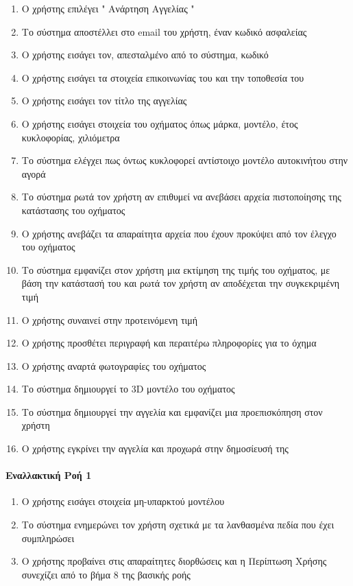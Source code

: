 \documentclass{../ol-softwaremanual}
\begin{document}
	\begin{enumerate}
		
		\item Ο χρήστης επιλέγει \en " \gr Ανάρτηση Αγγελίας \en " \gr 
		\item Το σύστημα αποστέλλει στο \en email \gr του χρήστη, έναν κωδικό ασφαλείας
		\item Ο χρήστης εισάγει τον, απεσταλμένο από το σύστημα, κωδικό
		\item Ο χρήστης εισάγει τα στοιχεία επικοινωνίας του και την τοποθεσία του
		\item Ο χρήστης εισάγει τον τίτλο της αγγελίας
		\item Ο χρήστης εισάγει στοιχεία του οχήματος όπως μάρκα, μοντέλο, έτος κυκλοφορίας, χιλιόμετρα
		\item Το σύστημα ελέγχει πως όντως κυκλοφορεί αντίστοιχο μοντέλο αυτοκινήτου στην αγορά
		\item Το σύστημα ρωτά τον χρήστη αν επιθυμεί να ανεβάσει αρχεία πιστοποίησης της κατάστασης του οχήματος
		\item Ο χρήστης ανεβάζει τα απαραίτητα αρχεία που έχουν προκύψει από τον έλεγχο του οχήματος		
		\item Το σύστημα εμφανίζει στον χρήστη μια εκτίμηση της τιμής του οχήματος, με βάση την κατάστασή του και ρωτά τον χρήστη αν αποδέχεται την συγκεκριμένη τιμή
		\item Ο χρήστης συναινεί στην προτεινόμενη τιμή
		\item Ο χρήστης προσθέτει περιγραφή και περαιτέρω πληροφορίες για το όχημα
		\item Ο χρήστης αναρτά φωτογραφίες του οχήματος
		\item Το σύστημα δημιουργεί το \en 3D \gr μοντέλο του οχήματος
		\item Το σύστημα δημιουργεί την αγγελία και εμφανίζει μια προεπισκόπηση στον χρήστη
		\item Ο χρήστης εγκρίνει την αγγελία και προχωρά στην δημοσίευσή της		
	\end{enumerate}
	
	\paragraph{Εναλλακτική Ροή 1}
	
	\begin{enumerate}
		\item O χρήστης εισάγει στοιχεία μη-υπαρκτού μοντέλου
		\item Το σύστημα ενημερώνει τον χρήστη σχετικά με τα λανθασμένα πεδία που έχει συμπληρώσει
		\item Ο χρήστης προβαίνει στις απαραίτητες διορθώσεις και η Περίπτωση Χρήσης συνεχίζει από το βήμα 8 της βασικής ροής
	\end{enumerate}
\end{document}
